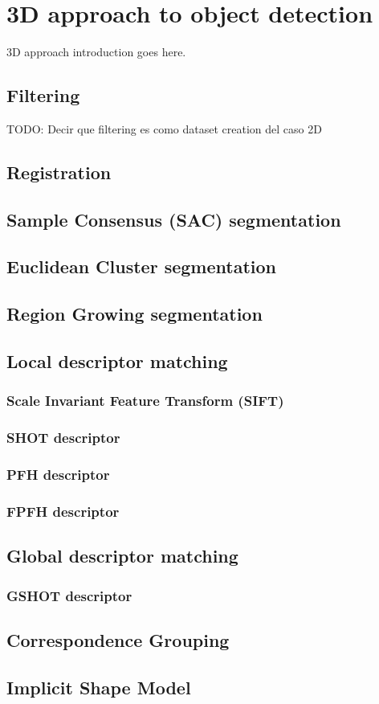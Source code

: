 \documentclass[../main.tex]{subfiles}
\begin{document}
\section{3D approach to object detection} \label{sec:3D_approach}
3D approach introduction goes here.

\subsection{Filtering}
TODO: Decir que filtering es como dataset creation del caso 2D

\subsection{Registration}

\subsection{Sample Consensus (SAC) segmentation}

\subsection{Euclidean Cluster segmentation}

\subsection{Region Growing segmentation}

\subsection{Local descriptor matching}
\subsubsection{Scale Invariant Feature Transform (SIFT)}

\subsubsection{SHOT descriptor}

\subsubsection{PFH descriptor}

\subsubsection{FPFH descriptor}

\subsection{Global descriptor matching}
\subsubsection{GSHOT descriptor}

\subsection{Correspondence Grouping}

\subsection{Implicit Shape Model}
\end{document}

